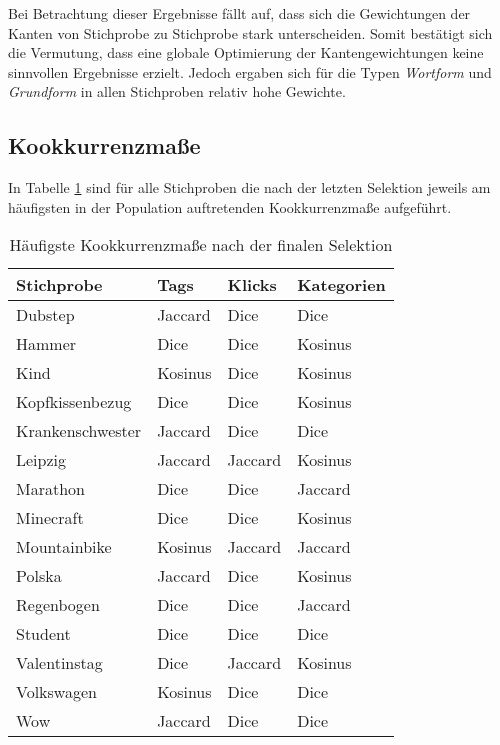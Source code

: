 Bei Betrachtung dieser Ergebnisse fällt auf, dass sich die Gewichtungen der Kanten von Stichprobe zu Stichprobe stark unterscheiden. Somit bestätigt sich die Vermutung, dass eine globale Optimierung der Kantengewichtungen keine sinnvollen Ergebnisse erzielt. Jedoch ergaben sich für die Typen \emph{Wortform} und \emph{Grundform} in allen Stichproben relativ hohe Gewichte.



\subsection{Kookkurrenzmaße}

In Tabelle \ref{tab:measures_each} sind für alle Stichproben die nach der letzten Selektion jeweils am häufigsten in der Population auftretenden Kookkurrenzmaße aufgeführt.

\begin{table}
\centering
\begin{tabular}{llll}
    \toprule
    Stichprobe & Tags & Klicks & Kategorien \\
    \midrule
    Dubstep & Jaccard & Dice & Dice \\
    Hammer & Dice & Dice & Kosinus \\
    Kind & Kosinus & Dice & Kosinus \\
    Kopfkissenbezug & Dice & Dice & Kosinus \\
    Krankenschwester & Jaccard & Dice & Dice \\
    Leipzig & Jaccard & Jaccard & Kosinus \\
    Marathon & Dice & Dice & Jaccard \\
    Minecraft & Dice & Dice & Kosinus \\
    Mountainbike & Kosinus & Jaccard & Jaccard \\
    Polska & Jaccard & Dice & Kosinus \\
    Regenbogen & Dice & Dice & Jaccard \\
    Student & Dice & Dice & Dice \\
    Valentinstag & Dice & Jaccard & Kosinus \\
    Volkswagen & Kosinus & Dice & Dice \\
    Wow & Jaccard & Dice & Dice \\
    \bottomrule
\end{tabular}
\caption{Häufigste Kookkurrenzmaße nach der finalen Selektion}
\label{tab:measures_each}
\end{table}